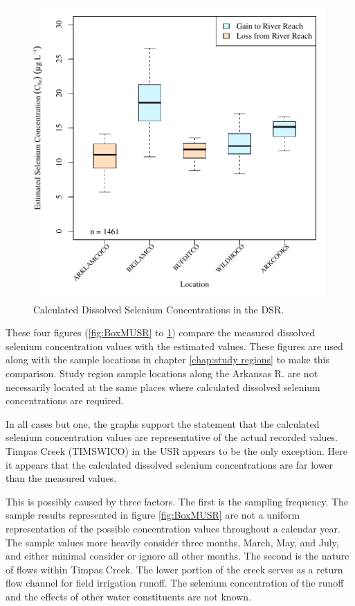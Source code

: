 \begin{linenumbers}
\begin{figure}[htbp]
\centering
	\includegraphics[width=6in]{"Figures/Results_DSR/Stochastic/c BOX Estimated CSe"}
	\caption[Calculated Dissolved Selenium Concentrations in the DSR.]{Calculated Dissolved Selenium Concentrations in the DSR.}
	\label{fig:BoxCDSR}
\end{figure}
These four figures (\ref{fig:BoxMUSR} to \ref{fig:BoxCDSR}) compare the measured dissolved selenium concentration values with the estimated values.  These figures are used along with the sample locations in chapter \ref{chap:study regions} to make this comparison.  Study region sample locations along the Arkansas R. are not necessarily located at the same places where calculated dissolved selenium concentrations are required.

In all cases but one, the graphs support the statement that the calculated selenium concentration values are representative of the actual recorded values.  Timpas Creek (TIMSWICO) in the USR appears to be the only exception.  Here it appears that the calculated dissolved selenium concentrations are far lower than the measured values.  

This is possibly caused by three factors.  The first is the sampling frequency.  The sample results represented in figure \ref{fig:BoxMUSR} are not a uniform representation of the possible concentration values throughout a calendar year.  The sample values more heavily consider three months, March, May, and July, and either minimal consider or ignore all other months.  The second is the nature of flows within Timpas Creek.  The lower portion of the creek serves as a return flow channel for field irrigation runoff.  The selenium concentration of the runoff and the effects of other water constituents are not known.  


\end{linenumbers}
